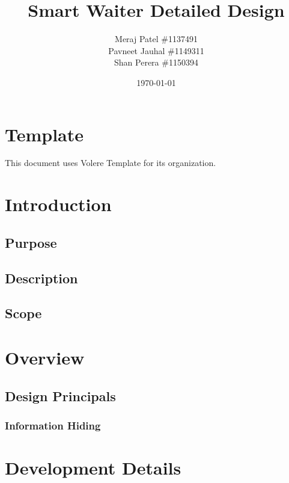 \documentclass[12pt, titlepage]{article}
\begin{document}
\title{Smart Waiter Detailed Design} 
\author{Meraj Patel \#1137491 \\ Pavneet Jauhal \#1149311\\ Shan Perera \#1150394}
\date{\today}
\maketitle

\tableofcontents 

\listoffigures

\listoftables


\section*{Template}
This document uses Volere Template for its organization.
\pagebreak

\section{Introduction}

\subsection{Purpose}

\subsection{Description}

\subsection{Scope}

\section{Overview}

\subsection{Design Principals}
\subsubsection{Information Hiding}


\section{Development Details}
\end{document}
